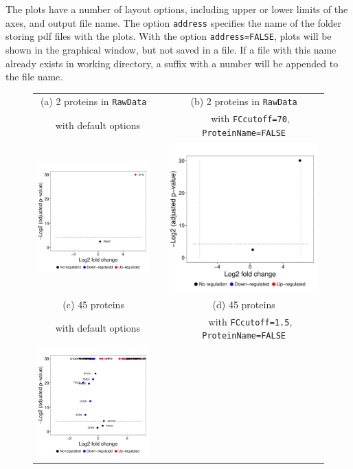 \documentclass[11pt]{article}
\begin{document}
The plots have a number of layout options, including upper or lower limits of the axes, and output file name. The option {\tt address} specifies the name of the folder storing pdf files with the plots. With the option {\tt address=FALSE}, plots will be shown in the graphical window, but not saved in a file. If a file with this name already exists in working directory, a suffix with a number will be appended to the file name.

\begin{figure}[h!]
\begin{center}
\begin{tabular}{ccc}
{\footnotesize (a) 2 proteins in {\tt RawData}}& & {\footnotesize (b) 2 proteins in {\tt RawData}} \\
{\footnotesize $~~~~$with default options}& & {\footnotesize $~~~~~~$with {\tt FCcutoff=70}, {\tt ProteinName=FALSE} } \\
\includegraphics[width=2.25in]{VolcanoYeast1.pdf}&&
\includegraphics[width=2.25in]{VolcanoYeast2.pdf}\\ [0.2in]
{\footnotesize (c) 45 proteins}& & {\footnotesize (d) 45 proteins} \\
{\footnotesize $~~~~$with default options }& & {\footnotesize $~~~~~~$with {\tt FCcutoff=1.5}, {\tt ProteinName=FALSE} } \\ 
\includegraphics[width=2.25in]{Volcano45Yeast1.pdf}&&

\end{tabular}
\end{center}
\end{figure}
\end{document}
